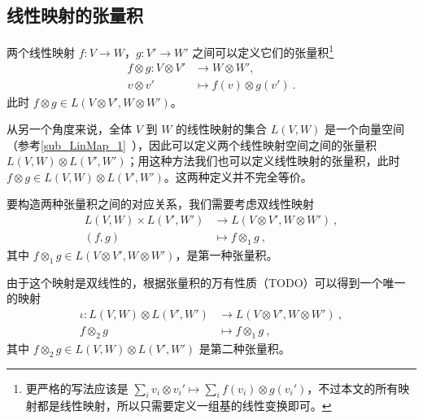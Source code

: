 
\begin{issues}
\issueDraft
{}
\end{issues}

\subsection{线性映射的张量积}

两个线性映射 $f: V \to W$，$g: V' \to W'$ 之间可以定义它们的张量积\footnote{更严格的写法应该是 $\sum_i v_i \otimes v_i' \mapsto \sum_i f(v_i) \otimes g(v_i')$，不过本文的所有映射都是线性映射，所以只需要定义一组基的线性变换即可。}
\begin{equation}
\begin{aligned}
f \otimes g: V \otimes V' &\to W \otimes W', \\
v \otimes v' &\mapsto f(v) \otimes g(v')~.
\end{aligned}
\end{equation}
此时 $f \otimes g \in L(V \otimes V', W \otimes W')$。

从另一个角度来说，全体 $V$ 到 $W$ 的线性映射的集合 $L(V, W)$ 是一个向量空间（参考\autoref{sub_LinMap_1}~），因此可以定义两个线性映射空间之间的张量积 $L(V, W) \otimes L(V', W')$；用这种方法我们也可以定义线性映射的张量积，此时 $f \otimes g \in L(V, W) \otimes L(V', W')$。这两种定义并不完全等价。


要构造两种张量积之间的对应关系，我们需要考虑双线性映射
\begin{equation}
\begin{aligned}
L(V, W) \times L(V', W') &\to L(V \otimes V', W \otimes W')~, \\
(f, g) &\mapsto f \otimes_1 g~,
\end{aligned}
\end{equation}
其中 $f \otimes_1 g \in L(V \otimes V', W \otimes W')$，是第一种张量积。


由于这个映射是双线性的，根据张量积的万有性质（TODO）可以得到一个唯一的映射
\begin{equation}
\begin{aligned}
\iota: L(V, W) \otimes L(V', W') &\to L(V \otimes V', W \otimes W')~, \\
f \otimes_2 g &\mapsto f \otimes_1 g~,
\end{aligned}
\end{equation}
其中 $f \otimes_2 g \in L(V, W) \otimes L(V', W')$ 是第二种张量积。


